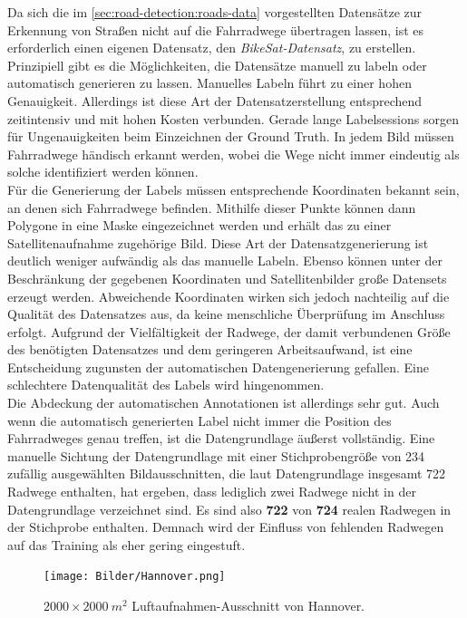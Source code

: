 Da sich die im \autoref{sec:road-detection:roads-data} vorgestellten Datensätze zur Erkennung von Straßen nicht auf die Fahrradwege übertragen lassen, 
ist es erforderlich einen eigenen Datensatz, den \textit{BikeSat-Datensatz}, zu erstellen.
Prinzipiell gibt es die Möglichkeiten, die Datensätze manuell zu labeln oder automatisch generieren zu lassen.
Manuelles Labeln führt zu einer hohen Genauigkeit.
Allerdings ist diese Art der Datensatzerstellung entsprechend zeitintensiv und mit hohen Kosten verbunden.
Gerade lange Labelsessions sorgen für Ungenauigkeiten beim Einzeichnen der Ground Truth. 
In jedem Bild müssen Fahrradwege händisch erkannt werden, wobei die Wege nicht immer eindeutig als solche identifiziert werden können.\\
Für die Generierung der Labels müssen entsprechende Koordinaten bekannt sein, an denen sich Fahrradwege befinden.
Mithilfe dieser Punkte können dann Polygone in eine Maske eingezeichnet werden und erhält das zu einer Satellitenaufnahme zugehörige Bild.
Diese Art der Datensatzgenerierung ist deutlich weniger aufwändig als das manuelle Labeln. 
Ebenso können unter der Beschränkung der gegebenen Koordinaten und Satellitenbilder große Datensets erzeugt werden.
Abweichende Koordinaten wirken sich jedoch nachteilig auf die Qualität des Datensatzes aus, da keine menschliche Überprüfung im Anschluss erfolgt.
Aufgrund der Vielfältigkeit der Radwege, der damit verbundenen Größe des benötigten Datensatzes und dem geringeren Arbeitsaufwand, ist eine Entscheidung zugunsten der automatischen Datengenerierung gefallen.
Eine schlechtere Datenqualität des Labels wird hingenommen. \\
Die Abdeckung der automatischen Annotationen ist allerdings sehr gut. Auch wenn die 
automatisch generierten Label nicht immer die Position des Fahrradweges genau treffen, 
ist die Datengrundlage äußerst vollständig. Eine manuelle Sichtung der Datengrundlage mit 
einer Stichprobengröße von 234 zufällig 
ausgewählten Bildausschnitten, die laut Datengrundlage insgesamt 722 Radwege enthalten, hat ergeben, 
dass lediglich zwei Radwege nicht in der Datengrundlage verzeichnet sind. Es sind also \textbf{722} 
von \textbf{724} realen Radwegen in der Stichprobe enthalten. Demnach wird der Einfluss von 
fehlenden Radwegen auf das Training als eher gering eingestuft.   
 

\begin{figure}
	\centering
	\texttt{[image: Bilder/Hannover.png]} 
	\caption{$2000{\times}2000~ m^2$ Luftaufnahmen-Ausschnitt von Hannover.}
	\label{fig:hannover-data}
\end{figure} 

